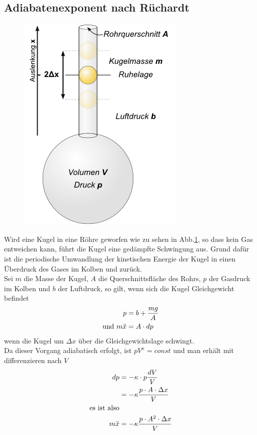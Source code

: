 \documentclass[12pt, a4paper, twoside]{scrartcl}
\begin{document}
\subsection{Adiabatenexponent nach Rüchardt}
\begin{figure} [!h]
\centering
\label{g:1}
\includegraphics[scale=0.5]{Ruechardt.png}
\protect\footnotemark
\end{figure}
Wird eine Kugel in eine Röhre geworfen wie zu sehen in Abb.\ref{g:1}, so dass kein Gas entweichen kann, führt die Kugel eine gedämpfte Schwingung aus. Grund dafür ist die periodische Umwandlung der kinetischen Energie der Kugel in einen Überdruck des Gases im Kolben und zurück.\\
Sei $m$ die Masse der Kugel, $A$ die Querschnittsfläche des Rohrs, $p$ der Gasdruck im Kolben und $b$ der Luftdruck, so gilt, wenn sich die Kugel Gleichgewicht befindet
\begin{align*}
p &= b+ \frac{mg}{A} \\
\textnormal{und } m\ddot{x} &= A \cdot dp
\end{align*}
wenn die Kugel um $\Delta x$ über die Gleichgewichtslage schwingt.\\
Da dieser Vorgang adiabatisch erfolgt, ist $pV^{\kappa} = const$ und man erhält mit differenzieren nach $V$
\begin{align*}
dp &= -\kappa \cdot p \frac{dV}{V} \\
&= -\kappa \frac{p \cdot A \cdot \Delta x}{V} \\
\textnormal{es ist also} \\
m \ddot{x} &= -\kappa \frac{p \cdot A^2 \cdot \Delta x}{V}
\end{align*}
\end{document}
